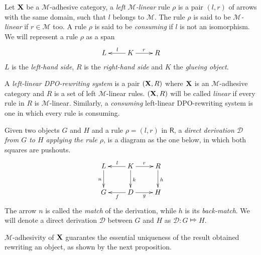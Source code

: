 \documentclass[a4paper,UKenglish,cleveref,pdftex, thm-restate,numberwithinsect]{lipics}
\def\R{\mathsf{R}}
\def\X{\textbf {\textup{X}}}
\newcommand{\dder}[1]{\mathscr{#1}}
\begin{document}
\begin{definition}
	Let $\X$ be a $\mathcal{M}$-adhesive category, a  \emph{left $\mathcal{M}$-linear} rule $\rho$ is a pair $(l,r)$ of arrows with the same domain, such that $l$ belongs to $\mathcal{M}$.  The rule $\rho$ is said to be \emph{$\mathcal{M}$-linear} if $r\in \mathcal{M}$ too. A rule $\rho$ is said to be \emph{consuming} if $l$ is not an isomorphism. We will represent a rule $\rho$ as a span 
	\[\xymatrix{L & K\ar[l]_{l} \ar[r]^{r} & R}\]
	$L$ is the \emph{left-hand side}, $R$ is the \emph{right-hand side} and $K$ the \emph{glueing object}. 
	
	
	A \emph{left-linear DPO-rewriting system} is a pair $(\X, \R)$ where $\X$ is an $\mathcal{M}$-adhesive category and $R$ is a set of left $\mathcal{M}$-linear rules. $(\X, \R)$ will be called \emph{linear} if every rule in $R$ is $\mathcal{M}$-linear. Similarly, a \emph{consuming} left-linear DPO-rewriting system is one in which every rule is consuming.
	
	Given  two objects $G$ and $H$ and a rule $\rho=(l,r)$ in $\R$, a \emph{direct derivation $\mathscr{D}$ from $G$ to $H$ applying the rule $\rho$}, is a diagram as the one below, in which both squares are pushouts. 
	\[\xymatrix{L \ar[d]_{n}& K \ar[d]^{k}\ar[l]_{l} \ar[r]^{r} & R \ar[d]^{h}\\G & \ar[l]^{f} D \ar[r]_{g}& H}\]
	The arrow $n$ is called the \emph{match} of the derivation, while $h$ is its \emph{back-match}.
	We will denote a direct derivation $\dder{D}$ between $G$ and $H$ as $\dder{D}\colon G\Mapsto H$. 
\end{definition}


$\mathcal{M}$-adhesivity of $\X$ guarantes the essential uniqueness of the result obtained rewriting an object, as shown by the next proposition.
\end{document}
